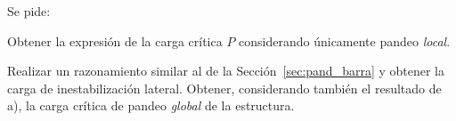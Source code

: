 \begin{center}
	\def\svgwidth{0.85\textwidth}
	
\end{center} 


Se pide:

\parte Obtener la expresión de la carga crítica $P$ considerando únicamente pandeo \textit{local}.

\parte Realizar un razonamiento similar al de la Sección~\ref{sec:pand_barra} y obtener la carga de inestabilización lateral. Obtener, considerando también el resultado de a), la carga crítica de pandeo \textit{global} de la estructura.